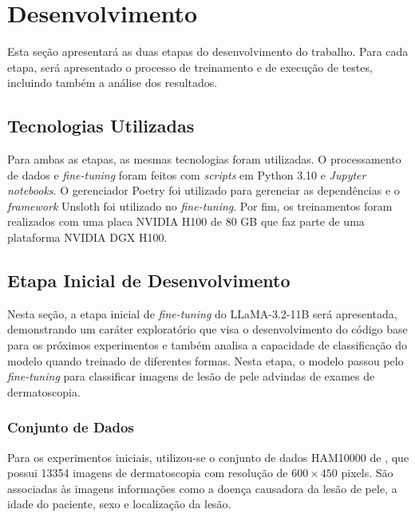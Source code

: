 \chapter{Desenvolvimento}

Esta seção apresentará as duas etapas do desenvolvimento do trabalho. Para cada etapa, será apresentado o processo de
treinamento e de execução de testes, incluindo também a análise dos resultados.

\section{Tecnologias Utilizadas}

Para ambas as etapas, as mesmas tecnologias foram utilizadas. O processamento de dados e \textit{fine-tuning} foram
feitos com \textit{scripts} em Python 3.10 e \textit{Jupyter notebooks}. O gerenciador Poetry foi utilizado para
gerenciar as dependências e o \textit{framework} Unsloth foi utilizado no \textit{fine-tuning}. Por fim, os
treinamentos foram realizados com uma placa NVIDIA H100 de 80 GB que faz parte de uma plataforma NVIDIA DGX H100.

\section{Etapa Inicial de Desenvolvimento}

Nesta seção, a etapa inicial de \textit{fine-tuning} do \ac{LLaMA}-3.2-11B será apresentada, demonstrando um caráter
exploratório que visa o desenvolvimento do código base para os próximos experimentos e também analisa a capacidade
de classificação do modelo quando treinado de diferentes formas. Nesta etapa, o modelo passou pelo \textit{fine-tuning}
para classificar imagens de lesão de pele advindas de exames de dermatoscopia.

\subsection{Conjunto de Dados}

Para os experimentos iniciais, utilizou-se o conjunto de dados \ac{HAM10000} de \textcite{tschandl2018ham10000}, que
possui 13354 imagens de dermatoscopia com resolução de \begin{math}600 \times 450\end{math} pixels. São associadas às
imagens informações como a doença causadora da lesão de pele, a idade do paciente, sexo e localização da lesão.

